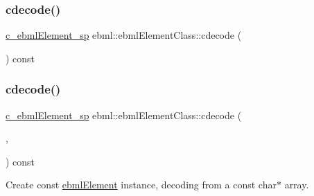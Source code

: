 \subsubsection{\texorpdfstring{cdecode()}{cdecode()}\hspace{0.1cm}{\footnotesize\ttfamily [2/6]}}
{\footnotesize\ttfamily \mbox{\hyperlink{namespaceebml_a2deef4e8071531b32e3533f1bf978917}{c\+\_\+ebml\+Element\+\_\+sp}} ebml\+::ebml\+Element\+Class\+::cdecode (\begin{DoxyParamCaption}\item[{const \mbox{\hyperlink{classebml_1_1parseFile}{parse\+File}} \&}]{ }\end{DoxyParamCaption}) const}

\mbox{\label{classebml_1_1ebmlElementClass_ab365b1b7024bbf0dd625694a71f7e7ba}} 
\subsubsection{\texorpdfstring{cdecode()}{cdecode()}\hspace{0.1cm}{\footnotesize\ttfamily [3/6]}}
{\footnotesize\ttfamily \mbox{\hyperlink{namespaceebml_a2deef4e8071531b32e3533f1bf978917}{c\+\_\+ebml\+Element\+\_\+sp}} ebml\+::ebml\+Element\+Class\+::cdecode (\begin{DoxyParamCaption}\item[{const char $\ast$}]{,  }\item[{size\+\_\+t}]{ }\end{DoxyParamCaption}) const}

Create const \mbox{\hyperlink{classebml_1_1ebmlElement}{ebml\+Element}} instance, decoding from a const char$\ast$ array.


